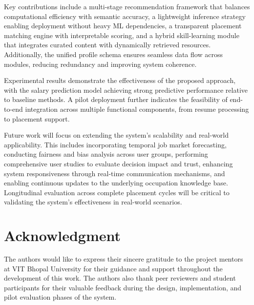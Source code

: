 \documentclass[conference]{IEEEtran}
\begin{document}
Key contributions include a multi-stage recommendation framework that
balances computational efficiency with semantic accuracy, a lightweight
inference strategy enabling deployment without heavy ML dependencies,
a transparent placement matching engine with interpretable scoring, and
a hybrid skill-learning module that integrates curated content with
dynamically retrieved resources. Additionally, the unified profile
schema ensures seamless data flow across modules, reducing redundancy
and improving system coherence.

Experimental results demonstrate the effectiveness of the proposed
approach, with the salary prediction model achieving strong predictive
performance relative to baseline methods. A pilot deployment further
indicates the feasibility of end-to-end integration across multiple
functional components, from resume processing to placement support.

Future work will focus on extending the system’s scalability and
real-world applicability. This includes incorporating temporal job
market forecasting, conducting fairness and bias analysis across user
groups, performing comprehensive user studies to evaluate decision
impact and trust, enhancing system responsiveness through real-time
communication mechanisms, and enabling continuous updates to the
underlying occupation knowledge base. Longitudinal evaluation across
complete placement cycles will be critical to validating the system’s
effectiveness in real-world scenarios.

\section*{Acknowledgment}
The authors would like to express their sincere gratitude to the
project mentors at VIT Bhopal University for their guidance and support
throughout the development of this work. The authors also thank peer
reviewers and student participants for their valuable feedback during
the design, implementation, and pilot evaluation phases of the system.
\end{document}
